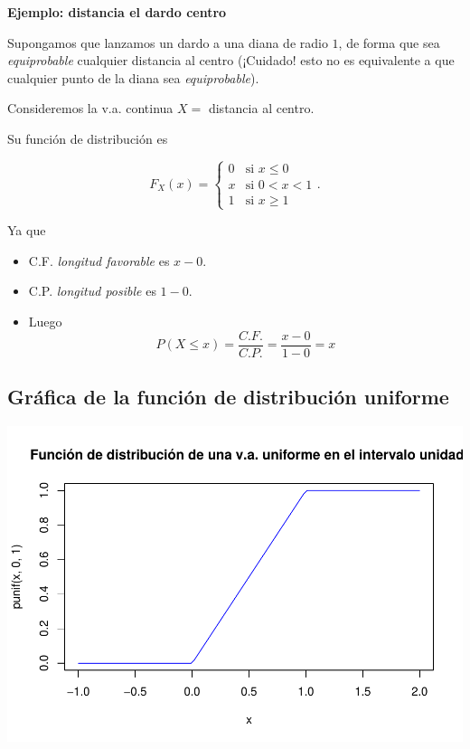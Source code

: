 \documentclass[]{book}
\providecommand{\tightlist}{%
  \setlength{\itemsep}{0pt}\setlength{\parskip}{0pt}}
\begin{document}
\textbf{Ejemplo: distancia el dardo centro}

Supongamos que lanzamos un dardo a una diana de radio \(1\), de forma que sea \emph{equiprobable} cualquier distancia al centro (¡Cuidado! esto no es equivalente
a que cualquier punto de la diana sea \emph{equiprobable}).

Consideremos la v.a. continua \(X=\) distancia al centro.

Su función de distribución es

\[
F_{X}(x)=
\left\{
\begin{array}{ll}
0 & \mbox{si } x\leq 0\\
x & \mbox{si } 0<x<1\\
1 & \mbox{si } x\geq 1
\end{array}
\right.
.
\]

Ya que

\begin{itemize}
\tightlist
\item
  C.F. \emph{longitud favorable} es \(x-0\).
\item
  C.P. \emph{longitud posible} es \(1-0\).
\item
  Luego
  \[P(X\leq x)=\frac{C.F.}{C.P.}=\frac{x-0}{1-0}=x\]
\end{itemize}

\hypertarget{gruxe1fica-de-la-funciuxf3n-de-distribuciuxf3n-uniforme}{%
\subsection{Gráfica de la función de distribución uniforme}\label{gruxe1fica-de-la-funciuxf3n-de-distribuciuxf3n-uniforme}}

\begin{center}\includegraphics{curso-probabilidad-udemy_files/figure-latex/figUNIF-7} \end{center}
\end{document}
